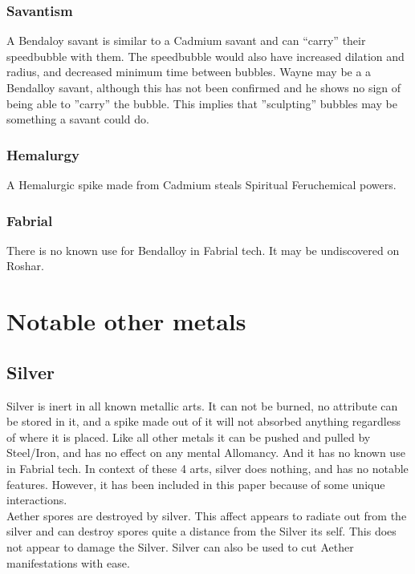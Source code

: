 \documentclass[conference]{IEEEtran}
\newcommand{\n}{\hfill\break}
\begin{document}
\subsubsection*{\textbf{Savantism}}
A Bendaloy savant is similar to a Cadmium savant and can ``carry'' their speedbubble with them.\cite{Bubble-move}  The speedbubble would also have increased dilation and radius,\cite{bubble-savant} and decreased minimum time between bubbles.\cite{TLM-CH8}  Wayne may be a a Bendalloy savant, although this has not been confirmed and he shows no sign of being able to ''carry'' the bubble.\cite{TLM-CH8}\cite{TLM-CH49}\cite{TLM-CH71} This implies that ''sculpting'' bubbles may be something a savant could do.\\
\subsubsection*{\textbf{Hemalurgy}}
A Hemalurgic spike made from Cadmium steals Spiritual Feruchemical powers.\cite{HE-TB}\\
\subsubsection*{\textbf{Fabrial}}
There is no known use for Bendalloy in Fabrial tech.  It may be undiscovered on Roshar.
\n
\section{\textbf{Notable other metals}}
\subsection*{\textbf{Silver}}
Silver is inert in all known metallic arts.\cite{HoA-CH60}  It can not be burned,\cite{AL-TB} no attribute can be stored in it,\cite{FE-TB} and a spike made out of it will not absorbed anything regardless of where it is placed.\cite{HE-TB}  Like all other metals it can be pushed and pulled by Steel/Iron,\cite{SoS-CH2} and has no effect on any mental Allomancy.\cite{silver-no-special}  And it has no known use in Fabrial tech.  In context of these 4 arts, silver does nothing, and has no notable features.\cite{no-silver-al}  However, it has been included in this paper because of some unique interactions. \\

Aether spores are destroyed by silver.\cite{ToES-CH1}  This affect appears to radiate out from the silver and can destroy spores quite a distance from the Silver its self.\cite{ToES-CH10}  This does not appear to damage the Silver.  Silver can also be used to cut Aether manifestations with ease.\\
\end{document}
